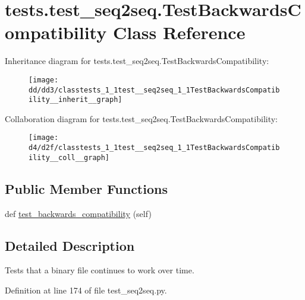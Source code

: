 \hypertarget{classtests_1_1test__seq2seq_1_1TestBackwardsCompatibility}{}\section{tests.\+test\+\_\+seq2seq.\+Test\+Backwards\+Compatibility Class Reference}
\label{classtests_1_1test__seq2seq_1_1TestBackwardsCompatibility}


Inheritance diagram for tests.\+test\+\_\+seq2seq.\+Test\+Backwards\+Compatibility\+:\nopagebreak
\begin{figure}[H]
\begin{center}
\leavevmode
\texttt{[image: dd/dd3/classtests\_1\_1test\_\_seq2seq\_1\_1TestBackwardsCompatibility\_\_inherit\_\_graph]}
\end{center}
\end{figure}


Collaboration diagram for tests.\+test\+\_\+seq2seq.\+Test\+Backwards\+Compatibility\+:\nopagebreak
\begin{figure}[H]
\begin{center}
\leavevmode
\texttt{[image: d4/d2f/classtests\_1\_1test\_\_seq2seq\_1\_1TestBackwardsCompatibility\_\_coll\_\_graph]}
\end{center}
\end{figure}
\subsection*{Public Member Functions}
\begin{DoxyCompactItemize}
\item 
def \hyperlink{classtests_1_1test__seq2seq_1_1TestBackwardsCompatibility_a16dafded5f7a24b334e692873a74b74b}{test\+\_\+backwards\+\_\+compatibility} (self)
\end{DoxyCompactItemize}


\subsection{Detailed Description}
\begin{DoxyVerb}Tests that a binary file continues to work over time.
\end{DoxyVerb}
 

Definition at line 174 of file test\+\_\+seq2seq.\+py.



